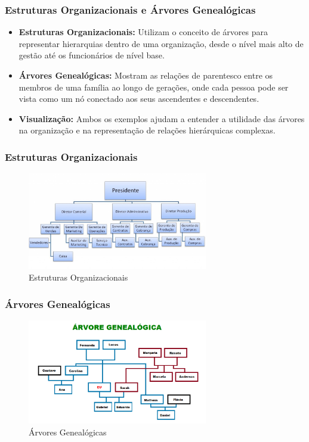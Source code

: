 \begin{frame}[fragile]
  \frametitle{Estruturas Organizacionais e Árvores Genealógicas}
  \begin{itemize}
    \item \textbf{Estruturas Organizacionais:} Utilizam o conceito de árvores para representar hierarquias dentro de uma organização, desde o nível mais alto de gestão até os funcionários de nível base.
    \item \textbf{Árvores Genealógicas:} Mostram as relações de parentesco entre os membros de uma família ao longo de gerações, onde cada pessoa pode ser vista como um nó conectado aos seus ascendentes e descendentes.
    \item \textbf{Visualização:} Ambos os exemplos ajudam a entender a utilidade das árvores na organização e na representação de relações hierárquicas complexas.
  \end{itemize}
\end{frame}
\begin{frame}[fragile]
  \frametitle{Estruturas Organizacionais}
  \begin{figure}
    \centering
    \includegraphics[width=0.7\textwidth]{assets/aula5-arvore-organograma.jpeg}
    \caption{Estruturas Organizacionais}
  \end{figure}
\end{frame}
\begin{frame}[fragile]
  \frametitle{Árvores Genealógicas}
  \begin{figure}
    \centering
    \includegraphics[width=0.7\textwidth]{assets/aula5-arvore-genealogica.png}
    \caption{Árvores Genealógicas}
  \end{figure}
\end{frame}
